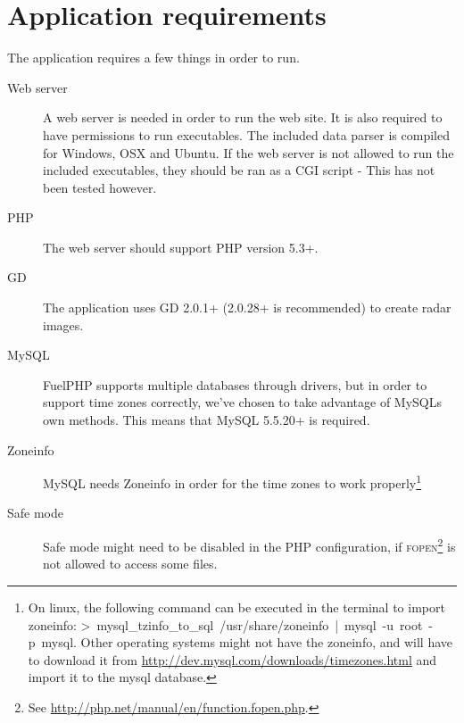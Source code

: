 \section{Application requirements}
\label{sec:application_requirements}
The application requires a few things in order to run.
\begin{description}
\item[Web server] A web server is needed in order to run the web site. It is also required to have permissions to run executables. The included data parser is compiled for Windows, OSX and Ubuntu. If the web server is not allowed to run the included executables, they should be ran as a CGI script - This has not been tested however.
\item[PHP] The web server should support PHP version 5.3+.
\item[GD] The application uses GD 2.0.1+ (2.0.28+ is recommended) to create radar images.
\item[MySQL] FuelPHP supports multiple databases through drivers, but in order to support time zones correctly, we've chosen to take advantage of MySQLs own methods. This means that MySQL 5.5.20+ is required.
\item[Zoneinfo] MySQL needs Zoneinfo in order for the time zones to work properly\footnote{On linux, the following command can be executed in the terminal to import zoneinfo: \mbox{\textsf{> mysql\_tzinfo\_to\_sql /usr/share/zoneinfo | mysql -u root -p mysql}}. Other operating systems might not have the zoneinfo, and will have to download it from \url{http://dev.mysql.com/downloads/timezones.html} and import it to the mysql database.}
\item[Safe mode] Safe mode might need to be disabled in the PHP configuration, if \textsc{fopen}\footnote{See \url{http://php.net/manual/en/function.fopen.php}.} is not allowed to access some files.
\end{description}
